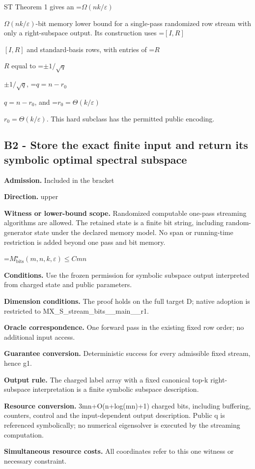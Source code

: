 \documentclass[10pt,a4paper]{article}
\newcommand{\AtlasMath}[1]{\par\begingroup\centering\setbox0=\hbox{$\displaystyle #1$}\ifdim\wd0>1.4\linewidth\typeout{ATLAS WIDE FORMULA: \the\wd0}\fi\ifdim\wd0>\linewidth\resizebox{\linewidth}{!}{\box0}\else\box0\fi\par\endgroup}
\newcommand{\AtlasInlineMath}[1]{\begingroup\setbox0=\hbox{$#1$}\ifdim\wd0>.4\linewidth\endgroup\AtlasMath{#1}\else\endgroup$#1$\fi}
\begin{document}
ST Theorem 1 gives an \AtlasInlineMath{\Omega(nk/\varepsilon)}-bit memory lower bound for a single-pass randomized row stream with only a right-subspace output. Its construction uses \AtlasInlineMath{[I,R]} and standard-basis rows, with entries of \AtlasInlineMath{R} equal to \AtlasInlineMath{\pm1/\sqrt q}, \AtlasInlineMath{q=n-r_0}, and \AtlasInlineMath{r_0=\Theta(k/\varepsilon)}. This hard subclass has the permitted public encoding.

\subsection{B2 - Store the exact finite input and return its symbolic optimal spectral subspace}
\textbf{Admission.} Included in the bracket

\textbf{Direction.} upper

\textbf{Witness or lower-bound scope.} Randomized computable one-pass streaming algorithms are allowed. The retained state is a finite bit string, including random-generator state under the declared memory model. No span or running-time restriction is added beyond one pass and bit memory.

\AtlasMath{M^\star_{\mathrm{bits}}(m,n,k,\varepsilon)\le Cmn}
\textbf{Conditions.} Use the frozen permission for symbolic subspace output interpreted from charged state and public parameters.

\textbf{Dimension conditions.} The proof holds on the full target D; native adoption is restricted to MX\_\allowbreak{}S\_\allowbreak{}stream\_\allowbreak{}bits\_\allowbreak{}\_\allowbreak{}main\_\allowbreak{}\_\allowbreak{}r1.

\textbf{Oracle correspondence.} One forward pass in the existing fixed row order; no additional input access.

\textbf{Guarantee conversion.} Deterministic success for every admissible fixed stream, hence g1.

\textbf{Output rule.} The charged label array with a fixed canonical top-k right-subspace interpretation is a finite symbolic subspace description.

\textbf{Resource conversion.} 3mn+O(n+log(mn)+1) charged bits, including buffering, counters, control and the input-dependent output description. Public q is referenced symbolically; no numerical eigensolver is executed by the streaming computation.

\textbf{Simultaneous resource costs.} All coordinates refer to this one witness or necessary constraint.
\end{document}

